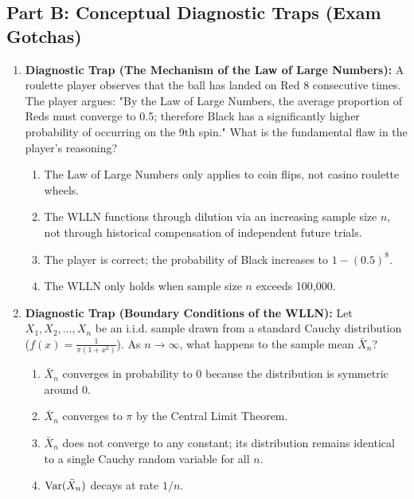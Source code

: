 \subsection*{Part B: Conceptual Diagnostic Traps (Exam Gotchas)}

\begin{enumerate}[resume]
\item \textbf{Diagnostic Trap (The Mechanism of the Law of Large Numbers):}
A roulette player observes that the ball has landed on Red 8 consecutive times. The player argues: "By the Law of Large Numbers, the average proportion of Reds must converge to 0.5; therefore Black has a significantly higher probability of occurring on the 9th spin." What is the fundamental flaw in the player's reasoning?
\begin{enumerate}
    \item The Law of Large Numbers only applies to coin flips, not casino roulette wheels.
    \item The WLLN functions through dilution via an increasing sample size $n$, not through historical compensation of independent future trials.
    \item The player is correct; the probability of Black increases to $1 - (0.5)^8$.
    \item The WLLN only holds when sample size $n$ exceeds 100,000.
\end{enumerate}

\item \textbf{Diagnostic Trap (Boundary Conditions of the WLLN):}
Let $X_1, X_2, \dots, X_n$ be an i.i.d. sample drawn from a standard Cauchy distribution ($f(x) = \frac{1}{\pi(1+x^2)}$). As $n \to \infty$, what happens to the sample mean $\bar{X}_n$?
\begin{enumerate}
    \item $\bar{X}_n$ converges in probability to 0 because the distribution is symmetric around 0.
    \item $\bar{X}_n$ converges to $\pi$ by the Central Limit Theorem.
    \item $\bar{X}_n$ does not converge to any constant; its distribution remains identical to a single Cauchy random variable for all $n$.
    \item $\operatorname{Var}(\bar{X}_n)$ decays at rate $1/n$.
\end{enumerate}
\end{enumerate}
